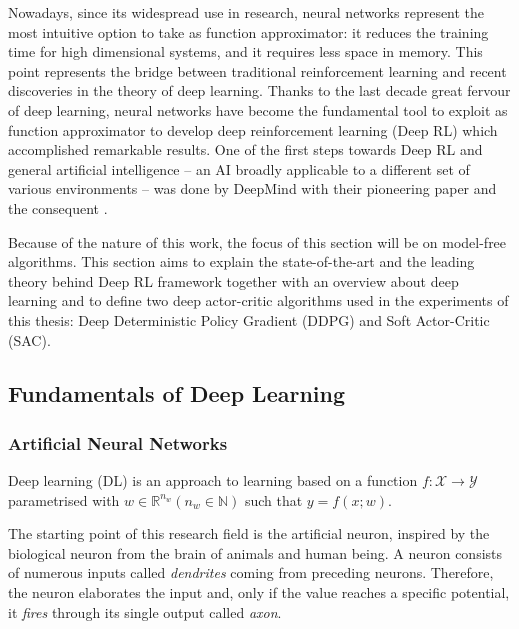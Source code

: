 Nowadays, since its widespread use in research, neural networks represent the most intuitive option to take as function approximator: it reduces the training time for high dimensional systems, and it requires less space in memory.
This point represents the bridge between traditional reinforcement learning and recent discoveries in the theory of deep learning.
Thanks to the last decade great fervour of deep learning, neural networks have become the fundamental tool to exploit as function approximator to develop deep reinforcement learning (Deep RL) which accomplished remarkable results. One of the first steps towards Deep RL and general artificial intelligence -- an AI broadly applicable to a different set of various environments -- was done by DeepMind with their pioneering paper \cite{mnih2013playing} and the consequent \cite{mnih2015human}.

Because of the nature of this work, the focus of this section will be on model-free algorithms.
This section aims to explain the state-of-the-art and the leading theory behind Deep RL framework together with an overview about deep learning and to define two deep actor-critic algorithms used in the experiments of this thesis: Deep Deterministic Policy Gradient (DDPG) and Soft Actor-Critic (SAC).

\subsection{Fundamentals of Deep Learning}

\subsubsection{Artificial Neural Networks}
Deep learning (DL) is an approach to learning based on a function $f: \mathcal{X} \rightarrow \mathcal{Y}$ parametrised with $w \in \mathbb{R}^{n_w} (n_w \in \mathbb{N})$ such that $y = f(x;w)$.

The starting point of this research field is the artificial neuron, inspired by the biological neuron from the brain of animals and human being. A neuron consists of numerous inputs called \textit{dendrites} coming from preceding neurons. Therefore, the neuron elaborates the input and, only if the value reaches a specific potential, it \textit{fires} through its single output called \textit{axon}.

